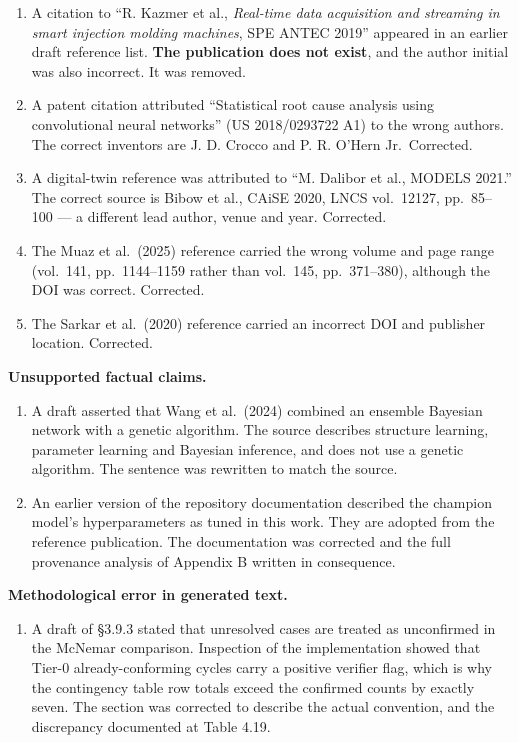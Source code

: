\begin{enumerate}
\def\labelenumi{\arabic{enumi}.}
\tightlist
\item
  A citation to ``R. Kazmer et al., \emph{Real-time data acquisition and streaming in smart injection molding machines}, SPE ANTEC 2019'' appeared in an earlier draft reference list. \textbf{The publication does not exist}, and the author initial was also incorrect. It was removed.
\item
  A patent citation attributed ``Statistical root cause analysis using convolutional neural networks'' (US 2018/0293722 A1) to the wrong authors. The correct inventors are J. D. Crocco and P. R. O'Hern Jr.~Corrected.
\item
  A digital-twin reference was attributed to ``M. Dalibor et al., MODELS 2021.'' The correct source is Bibow et al., CAiSE 2020, LNCS vol.~12127, pp.~85--100 --- a different lead author, venue and year. Corrected.
\item
  The Muaz et al.~(2025) reference carried the wrong volume and page range (vol.~141, pp.~1144--1159 rather than vol.~145, pp.~371--380), although the DOI was correct. Corrected.
\item
  The Sarkar et al.~(2020) reference carried an incorrect DOI and publisher location. Corrected.
\end{enumerate}

\textbf{Unsupported factual claims.}

\begin{enumerate}
\def\labelenumi{\arabic{enumi}.}
\setcounter{enumi}{5}
\tightlist
\item
  A draft asserted that Wang et al.~(2024) combined an ensemble Bayesian network with a genetic algorithm. The source describes structure learning, parameter learning and Bayesian inference, and does not use a genetic algorithm. The sentence was rewritten to match the source.
\item
  An earlier version of the repository documentation described the champion model's hyperparameters as tuned in this work. They are adopted from the reference publication. The documentation was corrected and the full provenance analysis of Appendix B written in consequence.
\end{enumerate}

\textbf{Methodological error in generated text.}

\begin{enumerate}
\def\labelenumi{\arabic{enumi}.}
\setcounter{enumi}{7}
\tightlist
\item
  A draft of §3.9.3 stated that unresolved cases are treated as unconfirmed in the McNemar comparison. Inspection of the implementation showed that Tier-0 already-conforming cycles carry a positive verifier flag, which is why the contingency table row totals exceed the confirmed counts by exactly seven. The section was corrected to describe the actual convention, and the discrepancy documented at Table 4.19.
\end{enumerate}

